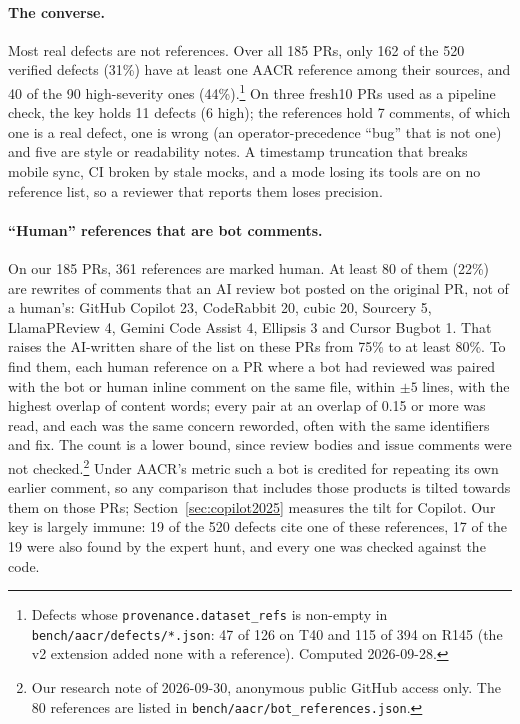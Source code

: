 \documentclass[11pt,a4paper]{article}
\newcommand{\code}[1]{\texttt{#1}}
\begin{document}
\paragraph{The converse.} Most real defects are not references. Over all
185 PRs, only 162 of the 520 verified defects (31\%) have at least one AACR
reference among their sources, and 40 of the 90 high-severity ones
(44\%).\footnote{Defects whose \code{provenance.dataset\_refs} is non-empty
in \code{bench/aacr/defects/*.json}: 47 of 126 on T40 and 115 of 394 on R145
(the v2 extension added none with a reference). Computed 2026-09-28.} On
three fresh10 PRs used as a pipeline check, the key holds 11 defects (6
high); the references hold 7 comments, of which one is a real defect, one is
wrong (an operator-precedence ``bug'' that is not one) and five are style or
readability notes. A timestamp truncation that breaks mobile sync, CI broken
by stale mocks, and a mode losing its tools are on no reference list, so a
reviewer that reports them loses precision.

\paragraph{``Human'' references that are bot comments.} On our 185 PRs, 361
references are marked human. At least 80 of them (22\%) are rewrites of
comments that an AI review bot posted on the original PR, not of a human's:
GitHub Copilot 23, CodeRabbit 20, cubic 20, Sourcery 5, LlamaPReview 4,
Gemini Code Assist 4, Ellipsis 3 and Cursor Bugbot 1. That raises the
AI-written share of the list on these PRs from 75\% to at least 80\%. To find
them, each human reference on a PR where a bot had reviewed was paired
with the bot or human inline comment on the same file, within $\pm5$ lines,
with the highest overlap of content words; every pair at an overlap of 0.15
or more was read, and each was the same concern reworded, often with the
same identifiers and fix. The count is a lower bound, since review bodies
and issue comments were not checked.\footnote{Our research note of
2026-09-30, anonymous public GitHub access only. The 80 references are
listed in \code{bench/aacr/bot\_references.json}.} Under AACR's metric such a
bot is credited for repeating its own earlier comment, so any comparison
that includes those products is tilted towards them on those PRs;
Section~\ref{sec:copilot2025} measures the tilt for Copilot. Our key is
largely immune: 19 of the 520 defects cite one of these references, 17 of
the 19 were also found by the expert hunt, and every one was checked
against the code.
\end{document}
